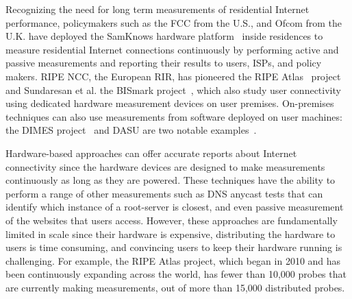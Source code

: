 Recognizing the need for long term measurements of residential
Internet performance, policymakers such as the FCC from the U.S., and
Ofcom from the U.K. have deployed the SamKnows hardware
platform~\cite{samknows} inside residences to measure residential
Internet connections continuously by performing active and passive
measurements and reporting their results to users, ISPs, and policy
makers. RIPE NCC, the European RIR, has pioneered the RIPE
Atlas~\cite{atlas} project and Sundaresan et al. the BISmark
project~\cite{bismark-main-bib}, which also study user connectivity
using dedicated hardware measurement devices on user
premises. On-premises techniques can also use measurements from
software deployed on user machines: the DIMES project~\cite{netdimes}
and DASU are two notable examples~\cite{Dasu:NSDI2013}.






Hardware-based approaches can offer accurate reports about
Internet connectivity since the hardware devices are designed to make
measurements continuously as long as they are powered. These techniques have the
ability to perform a range of other measurements such as DNS anycast
tests that can identify which instance of a root-server is closest,
and even passive measurement of the websites that users
access. However, these approaches are fundamentally limited in scale
since their hardware is expensive, distributing the hardware to users
is time consuming, and convincing users to keep their hardware running
is challenging. For example, the RIPE Atlas project, which began in
2010 and has been continuously expanding across the world, has fewer than 10,000 probes that are currently making measurements, out
of more than 15,000 distributed probes.

